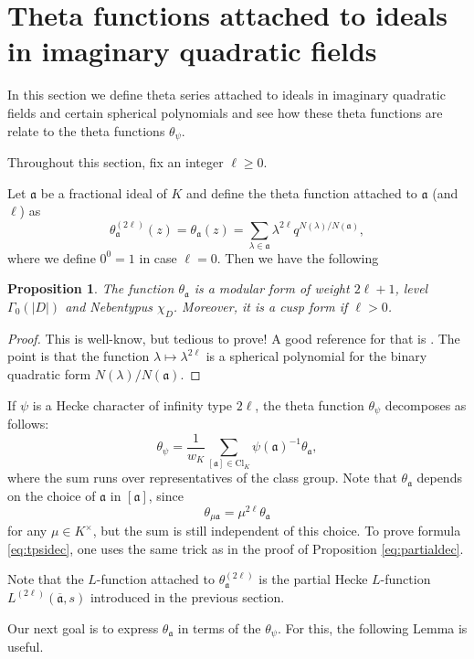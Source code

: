 \documentclass[twoside,10pt]{article}
\newtheorem{prop}{Proposition}
\newcommand{\ida}{\mathfrak{a}}
\newcommand{\Clk}{\text{Cl}_K}
\newcommand{\tpsi}{\theta_\psi}
\newcommand{\tida}{\theta_\mathfrak{a}}
\begin{document}
\section{Theta functions attached to ideals in imaginary quadratic fields}
In this section we define theta series attached to ideals in imaginary quadratic fields and certain spherical polynomials and see how these theta functions are relate to the theta functions $\tpsi$.

Throughout this section, fix an integer $\ell\geq 0$.

Let $\ida$ be a fractional ideal of $K$ and define the theta function attached to $\ida$ (and $\ell$) as
\[\theta_\ida^{(2\ell)}(z)=\tida(z)=\sum_{\lambda\in\ida}\lambda^{2\ell}q^{N(\lambda)/N(\ida)},\]
where we define $0^0=1$ in case $\ell=0$. Then we have the following
\begin{prop}
	The function $\tida$ is a modular form of weight $2\ell+1$, level $\Gamma_0(|D|)$ and Nebentypus $\chi_D$. Moreover, it is a cusp form if $\ell>0$.
\end{prop}
\begin{proof}
	This is well-know, but tedious to prove! A good reference for that is \cite[Thm. 10.9]{Iwan}. The point is that the function $\lambda\mapsto\lambda^{2\ell}$ is a spherical polynomial for the binary quadratic form $N(\lambda)/N(\ida)$. 
\end{proof}

If $\psi$ is a Hecke character of infinity type $2\ell$, the theta function $\tpsi$ decomposes as follows:
\begin{equation}\label{eq:tpsidec}
\tpsi=\frac{1}{w_K}\sum_{[\ida]\in\Clk}\psi(\ida)^{-1}\tida,
\end{equation}
where the sum runs over representatives of the class group. Note that $\tida$ depends on the choice of $\ida$ in $[\ida]$, since
\[\theta_{\mu\mathfrak{a}}=\mu^{2\ell}\tida\]
for any $\mu\in K^\times$, but the sum is still independent of this choice. To prove formula \ref{eq:tpsidec}, one uses the same trick as in the proof of Proposition \ref{eq:partialdec}.

Note that the $L$-function attached to $\theta_\ida^{(2\ell)}$ is the partial Hecke $L$-function $L^{(2\ell)}(\overline{\ida},s)$ introduced in the previous section.

Our next goal is to express $\tida$ in terms of the $\tpsi$. For this, the following Lemma is useful.
\end{document}
